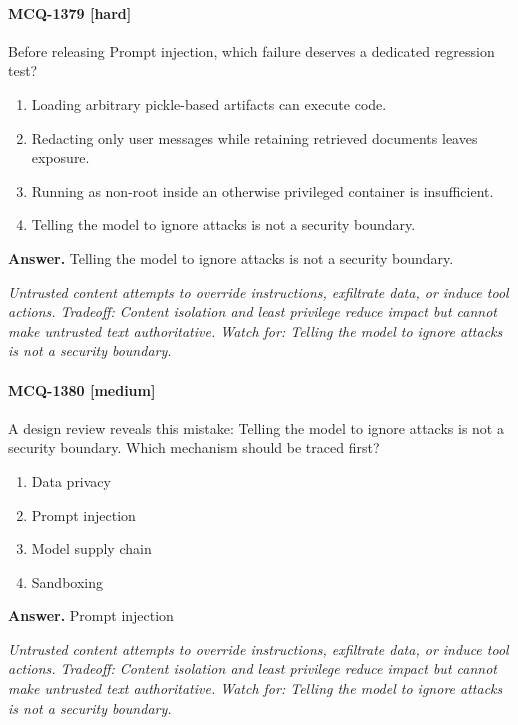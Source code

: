 \paragraph{MCQ-1379 [hard]} Before releasing Prompt injection, which failure deserves a dedicated regression test?
\begin{enumerate}[label=\Alph*.]
\item Loading arbitrary pickle-based artifacts can execute code.
\item Redacting only user messages while retaining retrieved documents leaves exposure.
\item Running as non-root inside an otherwise privileged container is insufficient.
\item Telling the model to ignore attacks is not a security boundary.
\end{enumerate}
\noindent\textbf{Answer.} Telling the model to ignore attacks is not a security boundary.
\par\textit{Untrusted content attempts to override instructions, exfiltrate data, or induce tool actions. Tradeoff: Content isolation and least privilege reduce impact but cannot make untrusted text authoritative. Watch for: Telling the model to ignore attacks is not a security boundary.}
\paragraph{MCQ-1380 [medium]} A design review reveals this mistake: Telling the model to ignore attacks is not a security boundary. Which mechanism should be traced first?
\begin{enumerate}[label=\Alph*.]
\item Data privacy
\item Prompt injection
\item Model supply chain
\item Sandboxing
\end{enumerate}
\noindent\textbf{Answer.} Prompt injection
\par\textit{Untrusted content attempts to override instructions, exfiltrate data, or induce tool actions. Tradeoff: Content isolation and least privilege reduce impact but cannot make untrusted text authoritative. Watch for: Telling the model to ignore attacks is not a security boundary.}
